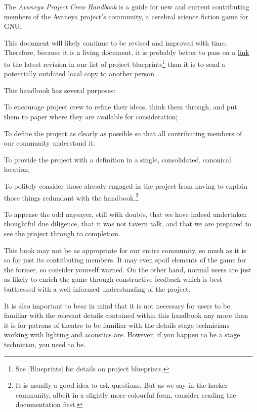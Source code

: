 

The {\it Avaneya Project Crew Handbook} is a guide for new and current contributing members of the Avaneya project's community, a cerebral science fiction game for GNU. 

This document will likely continue to be revised and improved with time. Therefore, because it is a living document, it is probably better to pass on a \href{\LatestHandbookURL}{link} to the latest revision in our list of project blueprints\footnote[]{See [Blueprints] for details on project blueprints.} than it is to send a potentially outdated local copy to another person.

This handbook has several purposes:

\startitemize[4]
\item
To encourage project crew to refine their ideas, think them through, and put them to paper where they are available for consideration;

\item
To define the project as clearly as possible so that all contributing members of our community understand it;

\item
To provide the project with a definition in a single, consolidated, canonical location;

\item
To politely consider those already engaged in the project from having to explain those things redundant with the handbook.\footnote[rtfm]{It is usually a good idea to ask questions. But as we say in the hacker community, albeit in a slightly more colourful form, consider reading the documentation first.}

\item
To appease the odd naysayer, still with doubts, that we have indeed undertaken thoughtful due diligence, that it was not tavern talk, and that we are prepared to see the project through to completion.
\stopitemize

This book may not be as appropriate for our entire community, so much as it is so for just its contributing members. It may even spoil elements of the game for the former, so consider yourself warned. On the other hand, normal users are just as likely to enrich the game through constructive feedback which is best buttressed with a well informed understanding of the project.

It is also important to bear in mind that it is not necessary for users to be familiar with the relevant details contained within this handbook any more than it is for patrons of theatre to be familiar with the details stage technicians working with lighting and acoustics are. However, if you happen to be a stage technician, you need to be.

\StopChapter


